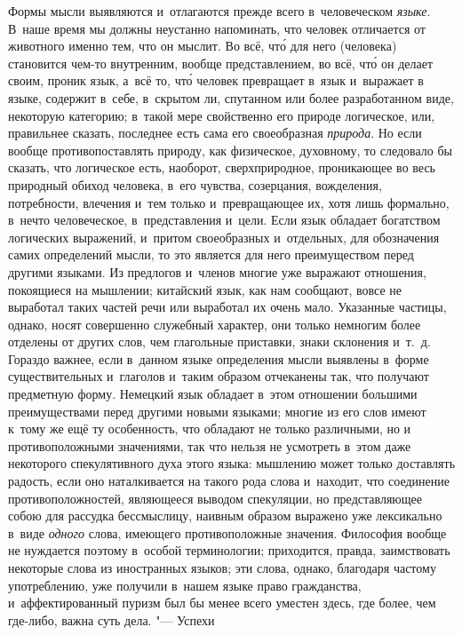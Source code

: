 Формы мысли выявляются и~отлагаются прежде всего в~человеческом {\em языке}.
В~наше время мы должны неустанно напоминать, что человек отличается от
животного именно тем, что он мыслит. Во всё, чт\'{о} для него (человека)
становится чем-то внутренним, вообще представлением, во всё, чт\'{о} он делает
своим, проник язык, а~всё то, чт\'{о} человек превращает в~язык и~выражает в
языке, содержит в~себе, в~скрытом ли, спутанном или более разработанном виде,
некоторую категорию; в~такой мере свойственно его природе логическое, или,
правильнее сказать, последнее есть сама его своеобразная {\em природа}. Но если
вообще противопоставлять природу, как физическое, духовному, то следовало бы
сказать, что логическое есть, наоборот, сверхприродное, проникающее во весь
природный обиход человека, в~его чувства, созерцания, вожделения, потребности,
влечения и~тем только и~превращающее их, хотя лишь формально, в~нечто
человеческое, в~представления и~цели. Если язык обладает богатством логических
выражений, и~притом своеобразных и~отдельных, для обозначения самих определений
мысли, то это является для него преимуществом перед другими языками. Из
предлогов и~членов многие уже выражают отношения, покоящиеся на мышлении;
китайский язык, как нам сообщают, вовсе не выработал таких частей речи или
выработал их очень мало. Указанные частицы, однако, носят совершенно служебный
характер, они только немногим более отделены от других слов, чем глагольные
приставки, знаки склонения и~т.~д. Гораздо важнее, если в~данном языке
определения мысли выявлены в~форме существительных и~глаголов и~таким образом
отчеканены так, что получают предметную форму. Немецкий язык обладает в~этом
отношении большими преимуществами перед другими новыми языками; многие из его
слов имеют к~тому же ещё ту особенность, что обладают не только различными, но
и противоположными значениями, так что нельзя не усмотреть в~этом даже
некоторого спекулятивного духа этого языка: мышлению может только доставлять
радость, если оно наталкивается на такого рода слова и~находит, что соединение
противоположностей, являющееся выводом спекуляции, но представляющее собою для
рассудка бессмыслицу, наивным образом выражено уже лексикально в~виде {\em
одного} слова, имеющего противоположные значения. Философия вообще не нуждается
поэтому в~особой терминологии; приходится, правда, заимствовать некоторые слова
из иностранных языков; эти слова, однако, благодаря частому употреблению, уже
получили в~нашем языке право гражданства, и~аффектированный пуризм был бы менее
всего уместен здесь, где более, чем где-либо, важна суть дела. "--- Успехи
